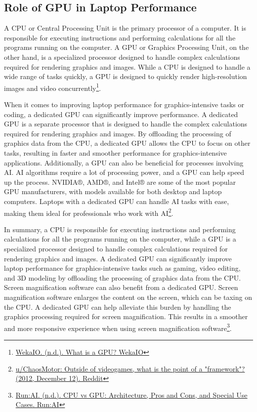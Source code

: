 \pagebreak \hypertarget{gpu-needs}{}\subsection{Role of GPU in Laptop Performance}\label{gpu-needs}
A CPU or Central Processing Unit is the primary processor of a computer. It is responsible for executing instructions and performing calculations for all the programs running on the computer. A GPU or Graphics Processing Unit, on the other hand, is a specialized processor designed to handle complex calculations required for rendering graphics and images. While a CPU is designed to handle a wide range of tasks quickly, a GPU is designed to quickly render high-resolution images and video concurrently\footnote{\raggedright \href{https://www.weka.io/learn/gpu/what-is-a-gpu/}{WekaIO. (n.d.). What is a GPU? WekaIO}}.

When it comes to improving laptop performance for graphics-intensive tasks or coding, a dedicated GPU can significantly improve performance. A dedicated GPU is a separate processor that is designed to handle the complex calculations required for rendering graphics and images. By offloading the processing of graphics data from the CPU, a dedicated GPU allows the CPU to focus on other tasks, resulting in faster and smoother performance for graphics-intensive applications. Additionally, a GPU can also be beneficial for processes involving AI. AI algorithms require a lot of processing power, and a GPU can help speed up the process. NVIDIA®,  AMD®,  and Intel® are some of the most popular GPU manufacturers, with models available for both desktop and laptop computers. Laptops with a dedicated GPU can handle AI tasks with ease, making them ideal for professionals who work with AI\footnote{\raggedright \href{https://www.reddit.com/r/framework/comments/14pb7b/outside_of_videogames_what_is_the_point_of_a/}{u/ChaosMotor: Outside of videogames, what is the point of a "framework"? (2012, December 12). Reddit}}.

In summary, a CPU is responsible for executing instructions and performing calculations for all the programs running on the computer, while a GPU is a specialized processor designed to handle complex calculations required for rendering graphics and images\footnotemark[52]. A dedicated GPU can significantly improve laptop performance for graphics-intensive tasks such as gaming, video editing, and 3D modeling by offloading the processing of graphics data from the CPU. Screen magnification software can also benefit from a dedicated GPU. Screen magnification software enlarges the content on the screen, which can be taxing on the CPU. A dedicated GPU can help alleviate this burden by handling the graphics processing required for screen magnification. This results in a smoother and more responsive experience when using screen magnification software\footnote{\raggedright \href{https://www.run.ai/guides/multi-gpu/cpu-vs-gpu}{Run:AI. (n.d.). CPU vs GPU: Architecture, Pros and Cons, and Special Use Cases. Run:AI}}.


